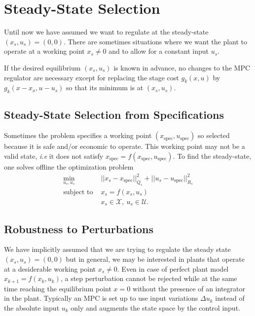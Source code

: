 \section{Steady-State Selection}
\label{sec:steady-state-selection}

Until now we have assumed we want to regulate at the steady-state $(x_s,u_s) = (0,0)$. There are sometimes situations where we want the plant to operate at a working point $x_s\neq 0$ and to allow for a constant input $u_s$.

If the desired equilibrium $(x_s, u_s)$ is known in advance, no changes to the MPC regulator are necessary except for replacing the stage cost $g_k(x,u)$ by $g_k(x-x_x,u-u_s)$ so that its minimum is at $(x_s,u_s)$.

\subsection{Steady-State Selection from Specifications}
\label{sec:steady-state-from-specs}

Sometimes the problem specifies a working point $(x_\text{spec},u_\text{spec})$ so selected because it is safe and/or economic to operate. This working point may not be a valid state, \textit{i.e} it does not satisfy $x_\text{spec} = f(x_\text{spec},u_\text{spec})$. To find the steady-state, one solves offline the optimization problem
\begin{align*}
  \min_{u_s,u_s} & ||x_s-x_\text{spec}||_{Q_s}^2 + ||u_s-u_\text{spec}||_{R_s}^2 \\
  \text{subject to } & x_s = f(x_s,u_s) \\
                 & x_s \in \mathcal{X},\ u_s \in \mathcal{U}.
\end{align*}


\subsection{Robustness to Perturbations}
\label{sec:robustness-to-perturbations}

We have implicitly assumed that we are trying to regulate the steady state $(x_s,u_s) = (0,0)$ but in general, we may be interested in plants that operate at a desiderable working point $x_s\neq 0$. Even in case of perfect plant model $x_{k+1} = f(x_k,u_k)$, a step perturbation cannot be rejected while at the same time reaching the equilibrium point $x=0$ without the presence of an integrator in the plant. Typically an MPC is set up to use input variations $\Delta u_k$ instead of the absolute input $u_k$ only and augments the state space by the control input.

